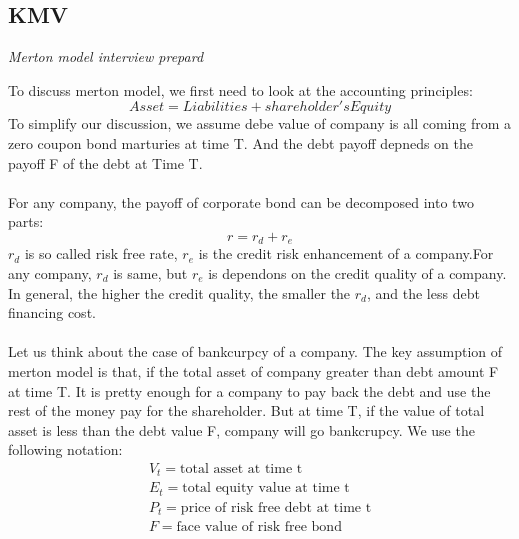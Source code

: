 \documentclass[a4paper,11pt]{article}
\begin{document}
\subsection{KMV}
\begin{centering}
\em{Merton model interview prepard}\\
\end{centering}

To discuss merton model, we first need to look at the accounting principles:
\begin{equation}
Asset=Liabilities+share holder's Equity
\end{equation}
To simplify our discussion, we assume debe value of company is all coming from a
zero coupon bond marturies at time T. And the debt payoff depneds on the payoff
F of the debt at Time T.\\\\
For any company, the payoff of corporate bond can be decomposed into two parts:
\begin{equation}
r=r_d+r_e
\end{equation}
$r_d$ is so called risk free rate, $r_e$ is the credit risk enhancement of a company.For
any company, $r_d$ is same, but $r_e$ is dependons on the credit quality of a company.
In general, the higher the credit quality, the smaller the $r_d$, and the less debt financing
cost.\\\\
Let us think about the case of bankcurpcy of a company. The key assumption of merton model
is that, if the total asset of company greater than debt amount F at time T. It is pretty
enough for a company to pay back the debt and use the rest of the money pay for the shareholder.
But at time T, if the value of total asset is less than the debt value F, company will go bankcrupcy.
We use the following notation:
\begin{equation}
\begin{array}{l}
\displaystyle V_t= \mbox {total asset at time t} \\
\displaystyle E_t= \mbox{total equity value at time t}\\
\displaystyle P_t= \mbox{price of risk free debt at time t}\\
\displaystyle F= \mbox{face value of risk free bond}\\
\end{array}
\label{eq:1}
\end{equation}
\end{document}

